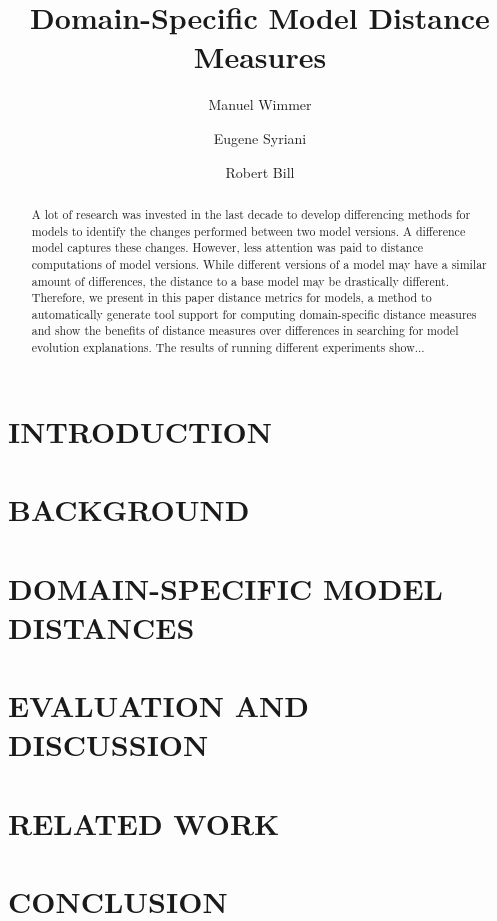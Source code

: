 \documentclass{llncs}
\newcommand\es[1]{\nb{ES}{\textcolor{red}{\textsl{#1}}}}
\begin{document}
    
\title{Domain-Specific Model Distance Measures}

\author{Manuel Wimmer \and Eugene Syriani \and Robert Bill}

\maketitle

\begin{abstract}
A lot of research was invested in the last decade to develop differencing methods for models to identify the changes performed between two model versions.
A difference model captures these changes. However, less attention was paid to distance computations of model versions. While different versions of a model may have a similar amount of differences,
the distance to a base model may be drastically different. Therefore, we present in this paper distance metrics for models, a method to automatically generate tool support for computing domain-specific distance measures and show the benefits of distance measures over differences in searching for model evolution explanations. The results of running different experiments show...\es{todo}
\end{abstract}


\section{INTRODUCTION}


\section{BACKGROUND}


\section{DOMAIN-SPECIFIC MODEL DISTANCES}


\section{EVALUATION AND DISCUSSION}


\section{RELATED WORK}


\section{CONCLUSION}




\end{document}
